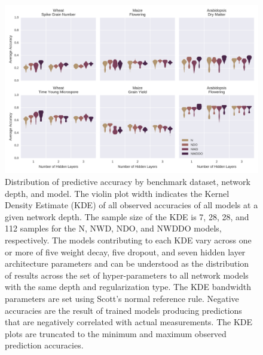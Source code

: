
\begin{figure}[htbp]
\renewcommand{\familydefault}{\sfdefault}\normalfont
\centering 
\includegraphics[keepaspectratio,height=\textheight,width=\linewidth]{g3_article/figures/depth_comparison.png}
    \caption{Distribution of predictive accuracy by benchmark dataset, network depth, 
             and model. The violin plot width indicates the Kernel Density Estimate 
             (KDE) of all observed accuracies of all models at a given network depth. 
             The sample size of the KDE is 7, 28, 28, and 112 samples for the 
             N, NWD, NDO, and NWDDO models, respectively. The models contributing 
             to each KDE vary across one or more of five weight decay, five dropout, 
             and seven hidden layer architecture parameters and can be 
             understood as the distribution of results across the set of 
             hyper-parameters to all network models with the same depth and regularization
             type. The KDE bandwidth parameters are set using Scott's normal reference rule. 
             Negative accuracies are the result of trained models producing predictions that 
             are negatively correlated with actual measurements. The KDE plots are 
             truncated to the minimum and maximum observed prediction accuracies.} 
\label{fig:depth-comparison}
\end{figure}

